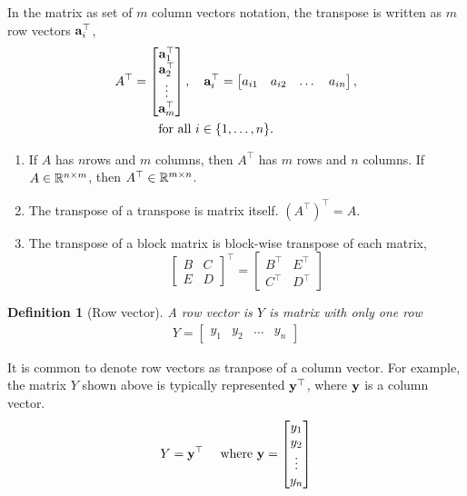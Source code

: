 \documentclass[twocolumn]{article}
\newtheorem{defn}{Definition}
\begin{document}
In  the matrix as set of  $m$ column  vectors notation, the transpose is written as $m$
row  vectors $\mathbf{a}_i^\top$,
%
\begin{align}
  A^\top  &=  \begin{bmatrix}
    \mathbf{a}_1^\top \\ \mathbf{a}_2^\top \\ \vdots \\  \mathbf{a}_m^\top
  \end{bmatrix},
  \quad
  \mathbf{a}_i^\top = \begin{bmatrix}
    a_{i1}  & a_{i2}  &   \dots &  a_{in}
  \end{bmatrix},
                                  \notag \\
  &\qquad \text{for all } i \in \{1, \dots, n\}.
\end{align}
%

\begin{enumerate}
\item  If $A$ has $n$rows and  $m$  columns, then  $A^\top$  has $m$ rows and
  $n$  columns. If  $A \in \mathbb{R}^{n \times  m}$, then  $A^\top \in \mathbb{R}^{m
    \times n}$.
  \item  The transpose  of  a transpose is matrix itself. $(A^\top)^\top = A$.
  \item  The transpose of a block matrix is  block-wise  transpose  of  each
    matrix,
    \[
    \begin{bmatrix}
      B  &   C \\
      E & D
    \end{bmatrix}^\top
    = 
    \begin{bmatrix}
      B^\top  & E^\top \\
      C^\top & D^\top
    \end{bmatrix}
    \]
    
\end{enumerate}


\begin{defn}[Row vector]
  A row vector is $Y$ is matrix  with only one row
  \begin{align}
    Y  =  \begin{bmatrix}
      y_{1} &
      y_{2} &
      \dots  &
      y_{n}
    \end{bmatrix}
  \end{align}
\end{defn}
It is common  to denote row vectors as tranpose  of  a  column vector. For
example, the  matrix  $Y$ shown above is typically represented  $\mathbf{y}^\top$, where
$\mathbf{y}$  is a column vector.
%
  \begin{align}
    Y  &=  \mathbf{y}^\top & \text{ where } \mathbf{y} = \begin{bmatrix}
      y_{1} \\
      y_{2} \\
      \vdots  \\
      y_{n}
    \end{bmatrix}
  \end{align}
\end{document}
